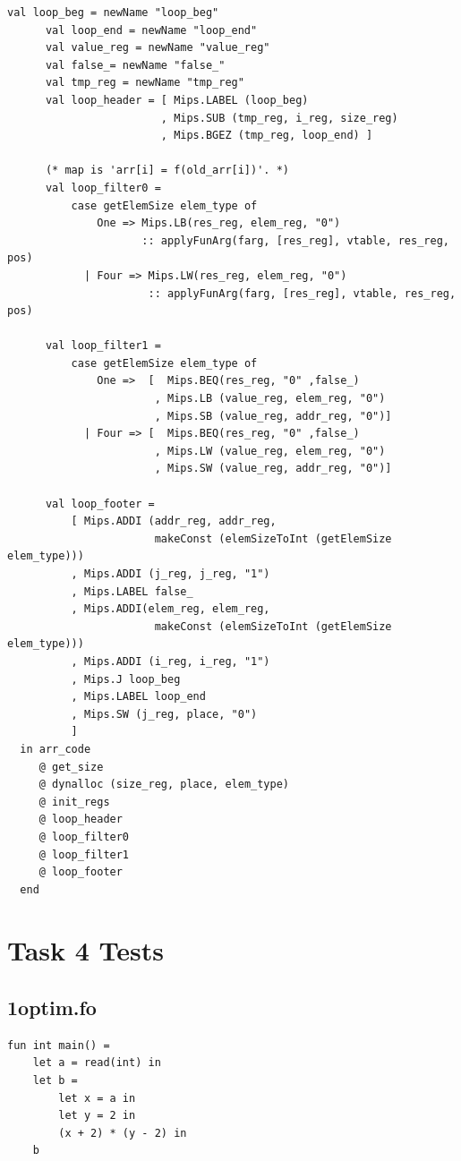 \documentclass[11pt]{article}
\begin{document}
\begin{lstlisting}[basicstyle=\small]
      val loop_beg = newName "loop_beg"
      val loop_end = newName "loop_end"
      val value_reg = newName "value_reg"
      val false_= newName "false_"
      val tmp_reg = newName "tmp_reg"
      val loop_header = [ Mips.LABEL (loop_beg)
                        , Mips.SUB (tmp_reg, i_reg, size_reg)
                        , Mips.BGEZ (tmp_reg, loop_end) ]

      (* map is 'arr[i] = f(old_arr[i])'. *)
      val loop_filter0 =
          case getElemSize elem_type of
              One => Mips.LB(res_reg, elem_reg, "0")
                     :: applyFunArg(farg, [res_reg], vtable, res_reg, pos)
            | Four => Mips.LW(res_reg, elem_reg, "0")
                      :: applyFunArg(farg, [res_reg], vtable, res_reg, pos)

      val loop_filter1 =
          case getElemSize elem_type of
              One =>  [  Mips.BEQ(res_reg, "0" ,false_)
                       , Mips.LB (value_reg, elem_reg, "0")
                       , Mips.SB (value_reg, addr_reg, "0")]
            | Four => [  Mips.BEQ(res_reg, "0" ,false_)
                       , Mips.LW (value_reg, elem_reg, "0")
                       , Mips.SW (value_reg, addr_reg, "0")]

      val loop_footer =
          [ Mips.ADDI (addr_reg, addr_reg,
                       makeConst (elemSizeToInt (getElemSize elem_type)))
          , Mips.ADDI (j_reg, j_reg, "1")
          , Mips.LABEL false_
          , Mips.ADDI(elem_reg, elem_reg,
                       makeConst (elemSizeToInt (getElemSize elem_type)))
          , Mips.ADDI (i_reg, i_reg, "1")
          , Mips.J loop_beg
          , Mips.LABEL loop_end
          , Mips.SW (j_reg, place, "0")
          ]
  in arr_code
     @ get_size
     @ dynalloc (size_reg, place, elem_type)
     @ init_regs
     @ loop_header
     @ loop_filter0
     @ loop_filter1
     @ loop_footer
  end
    \end{lstlisting}

    \section{Task 4 Tests}

    \subsection{1optim.fo}
    \begin{lstlisting}[basicstyle=\small]
fun int main() =
    let a = read(int) in
    let b =
        let x = a in
        let y = 2 in
        (x + 2) * (y - 2) in
    b
    \end{lstlisting}
\end{document}
